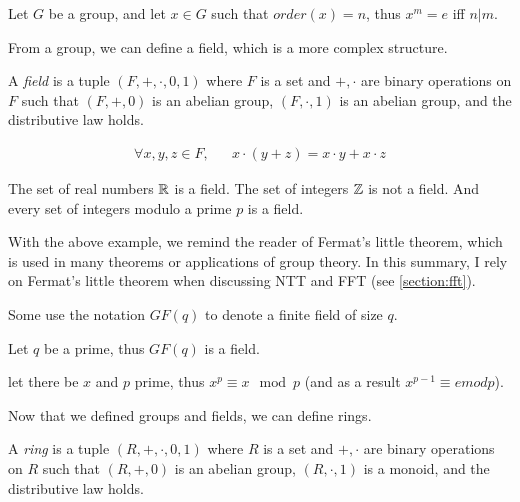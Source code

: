 \begin{theorem}
    Let $G$ be a group, and let $x\in G$ such that $order(x)=n$, thus $x^m=e$ iff $n|m$.
\end{theorem}

From a group, we can define a field, which is a more complex structure.

\begin{definition}
    A \emph{field} is a tuple $(F,+,\cdot,0,1)$ where $F$ is a set and $+,\cdot$ are binary operations on $F$
    such that $(F,+,0)$ is an abelian group, $(F,\cdot,1)$ is an abelian group, and the distributive law holds.

    \begin{align*}
        \forall x,y,z\in F, && x\cdot(y+z) = x\cdot y + x\cdot z
    \end{align*}
\end{definition}

\begin{example}
    The set of real numbers $\mathbb{R}$ is a field. 
    The set of integers $\mathbb{Z}$ is not a field.
    And every set of integers modulo a prime $p$ is a field.
\end{example}

With the above example, we remind the reader of Fermat's little theorem, which 
is used in many theorems or applications of group theory. In this summary, I rely on Fermat's little theorem
when discussing NTT and FFT (see \autoref{section:fft}).


Some use the notation $GF(q)$ to denote a finite field of size $q$.
\begin{theorem}
    Let $q$ be a prime, thus $GF(q)$ is a field.
\end{theorem}

\begin{theorem}\label{fermats-little-theorem}
    let there be $x$ and $p$ prime, thus $x^p \equiv x \mod p$
    (and as a result $x^{p-1}\equiv e mod p$).
\end{theorem}


Now that we defined groups and fields, we can define rings.
\begin{definition}
    A \emph{ring} is a tuple $(R,+,\cdot,0,1)$ where $R$ is a set and $+,\cdot$ are binary operations on $R$
    such that $(R,+,0)$ is an abelian group, $(R,\cdot,1)$ is a monoid, and the distributive law holds.

\end{definition}

